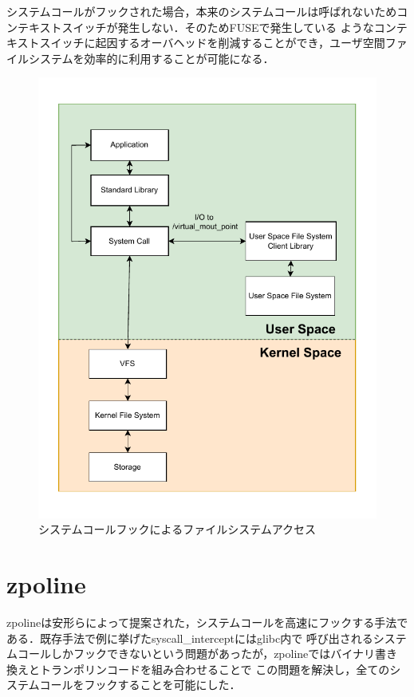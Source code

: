 \documentclass[a4paper,11pt]{jreport}
\begin{document}
システムコールがフックされた場合，本来のシステムコールは呼ばれないためコンテキストスイッチが発生しない．そのためFUSEで発生している
ようなコンテキストスイッチに起因するオーバヘッドを削減することができ，ユーザ空間ファイルシステムを効率的に利用することが可能になる．
\begin{figure}[h]
	\begin{minipage}[b]{1\columnwidth}
		\centering
		\includegraphics[width=0.9\linewidth]{./figure/syscall_hook_v3.pdf}
		\caption{システムコールフックによるファイルシステムアクセス}
		\label{fig:Syscall hook}
	\end{minipage}
\end{figure}

\section{zpoline}
zpolineは安形らによって提案された，システムコールを高速にフックする手法である．既存手法で例に挙げたsyscall\_interceptにはglibc内で
呼び出されるシステムコールしかフックできないという問題があったが，zpolineではバイナリ書き換えとトランポリンコードを組み合わせることで
この問題を解決し，全てのシステムコールをフックすることを可能にした．
\end{document}
